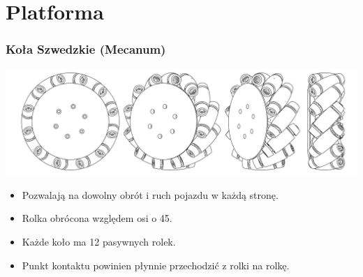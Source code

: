 \documentclass{beamer}
\begin{document}
	\section{Platforma}
	\begin{frame}
		\frametitle{Koła Szwedzkie (Mecanum)}
		\centering
		\includegraphics[width=\textwidth]{graphics/wheel.pdf}
		\begin{itemize}
			\item Pozwalają na dowolny obrót i ruch pojazdu w każdą stronę.
			\item Rolka obrócona względem osi o 45\textdegree.
			\item Każde koło ma 12 pasywnych rolek.
			\item Punkt kontaktu powinien płynnie przechodzić z rolki na rolkę.
		\end{itemize}
	\end{frame}
\end{document}

